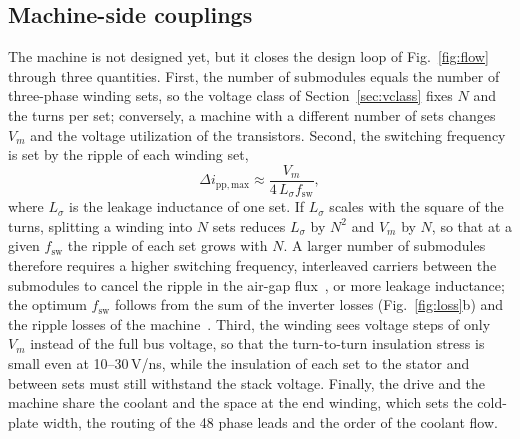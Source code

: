 \documentclass[conference]{IEEEtran}
\begin{document}
\subsection{Machine-side couplings}
The machine is not designed yet, but it closes the design loop of Fig.~\ref{fig:flow} through three quantities. First, the number of submodules equals the number of three-phase winding sets, so the voltage class of Section~\ref{sec:vclass} fixes $N$ and the turns per set; conversely, a machine with a different number of sets changes $V_m$ and the voltage utilization of the transistors. Second, the switching frequency is set by the ripple of each winding set,
\begin{equation}
\Delta i_\mathrm{pp,max}\approx\frac{V_m}{4\,L_\sigma f_\mathrm{sw}},
\label{eq:ripple}
\end{equation}
where $L_\sigma$ is the leakage inductance of one set. If $L_\sigma$ scales with the square of the turns, splitting a winding into $N$ sets reduces $L_\sigma$ by $N^2$ and $V_m$ by $N$, so that at a given $f_\mathrm{sw}$ the ripple of each set grows with $N$. A larger number of submodules therefore requires a higher switching frequency, interleaved carriers between the submodules to cancel the ripple in the air-gap flux~\cite{bringezu2020}, or more leakage inductance; the optimum $f_\mathrm{sw}$ follows from the sum of the inverter losses (Fig.~\ref{fig:loss}b) and the ripple losses of the machine~\cite{cooke2024}. Third, the winding sees voltage steps of only $V_m$ instead of the full bus voltage, so that the turn-to-turn insulation stress is small even at 10--30\,V/ns, while the insulation of each set to the stator and between sets must still withstand the stack voltage. Finally, the drive and the machine share the coolant and the space at the end winding, which sets the cold-plate width, the routing of the 48 phase leads and the order of the coolant flow.

\end{document}
